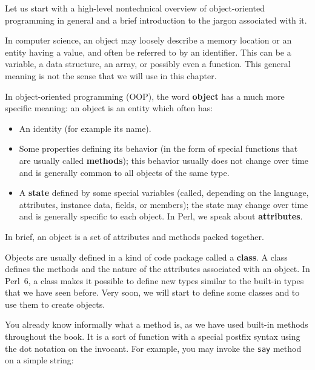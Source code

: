 Let us start with a high-level nontechnical overview 
of object-oriented programming in general and a brief 
introduction to the jargon associated with it.

In computer science, an object may loosely describe a memory 
location or an entity having a value, and often be referred to 
by an identifier. This can be a variable, a data structure, 
an array, or possibly even a function. This general meaning 
is not the sense that we will use in this chapter.

In object-oriented programming (OOP), the word {\bf object} 
has a much more specific meaning: an object is an entity 
which often has:
\begin{itemize}

\item An identity (for example its name).

\item Some properties defining its behavior (in the form of 
special functions that are usually called {\bf methods}); this 
behavior usually does not change over time and is generally 
common to all objects of the same type.

\item A {\bf state} defined by some special variables (called, 
depending on the language, attributes, instance data, fields, 
or members); the state may change over time and is generally 
specific to each object. In Perl, we speak about 
{\bf attributes}.
\end{itemize}

In brief, an object is a set of attributes and methods packed 
together.

Objects are usually defined in a kind of code package called 
a {\bf class}. A class defines the methods and the nature of 
the attributes associated with an object. In Perl~6, a class makes it 
possible to define new types similar to the built-in types 
that we have seen before. Very soon, we will start to define 
some classes and to use them to create objects.

You already know informally what a method is, as we have 
used built-in methods throughout the book. It is a sort of 
function with a special postfix syntax using the dot notation 
on the invocant. For example, you may invoke the {\tt say} 
method on a simple string:

